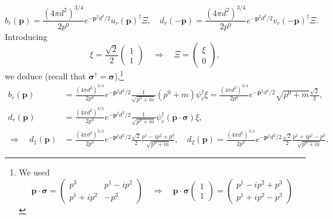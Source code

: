 \begin{equation}
    b_r(\mathbf{p}) = \frac{(4\pi d^2)^{3/4}}{2p^0} e^{-\mathbf{p}^2d^2/2} u_r(\mathbf{p})^\dagger \Xi, \quad d_r(-\mathbf{p}) = \frac{(4\pi d^2)^{3/4}}{2p^0} e^{-\mathbf{p}^2d^2/2} v_r(-\mathbf{p})^\dagger \Xi.
\end{equation}
Introducing
\begin{equation}
    \xi = \frac{\sqrt{2}}{2} \begin{pmatrix} 1 \\ 1 \end{pmatrix} \quad \Rightarrow \quad \Xi = \begin{pmatrix} \xi \\ 0 \end{pmatrix},
\end{equation}
we deduce (recall that $\boldsymbol{\sigma}^\dagger = \boldsymbol{\sigma}$),\footnote{We used
\begin{equation}
    \mathbf{p}\cdot\boldsymbol{\sigma} = \begin{pmatrix} p^3 & p^1-ip^2 \\ p^1+ip^2 & -p^3 \end{pmatrix} \quad \Rightarrow \quad \mathbf{p}\cdot\boldsymbol{\sigma} \begin{pmatrix} 1 \\ 1 \end{pmatrix} = \begin{pmatrix} p^1-ip^2+p^3 \\ p^1+ip^2-p^3 \end{pmatrix}
\end{equation}}
\begin{equation}
\begin{aligned}
    b_r(\mathbf{p}) &= \frac{(4\pi d^2)^{3/4}}{2p^0} e^{-\mathbf{p}^2d^2/2} \frac{1}{\sqrt{p^0+m}} (p^0+m)\psi_r^\dagger \xi = \frac{(4\pi d^2)^{3/4}}{2p^0} e^{-\mathbf{p}^2d^2/2} \sqrt{p^0+m} \frac{\sqrt{2}}{2}, \\
    d_r(\mathbf{p}) &= \frac{(4\pi d^2)^{3/4}}{2p^0} e^{-\mathbf{p}^2d^2/2} \frac{1}{\sqrt{p^0+m}} \psi_r^\dagger (\mathbf{p}\cdot\boldsymbol{\sigma}) \xi, \\
    \Rightarrow \quad d_1(\mathbf{p}) &= \frac{(4\pi d^2)^{3/4}}{2p^0} e^{-\mathbf{p}^2d^2/2} \frac{\sqrt{2}}{2} \frac{p^1-ip^2+p^3}{\sqrt{p^0+m}}, \quad d_2(\mathbf{p}) = \frac{(4\pi d^2)^{3/4}}{2p^0} e^{-\mathbf{p}^2d^2/2} \frac{\sqrt{2}}{2} \frac{p^1+ip^2-p^3}{\sqrt{p^0+m}}.
\end{aligned}
\end{equation}

